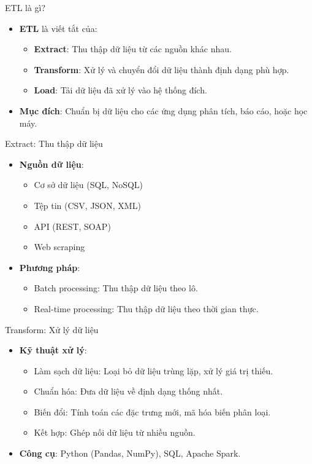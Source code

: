 \documentclass{beamer}
\begin{document}
\begin{frame}{ETL là gì?}
    \begin{itemize}
        \item \textbf{ETL} là viết tắt của:
        \begin{itemize}
            \item \textbf{Extract}: Thu thập dữ liệu từ các nguồn khác nhau.
            \item \textbf{Transform}: Xử lý và chuyển đổi dữ liệu thành định dạng phù hợp.
            \item \textbf{Load}: Tải dữ liệu đã xử lý vào hệ thống đích.
        \end{itemize}
        \item \textbf{Mục đích}: Chuẩn bị dữ liệu cho các ứng dụng phân tích, báo cáo, hoặc học máy.
    \end{itemize}
\end{frame}

\begin{frame}{Extract: Thu thập dữ liệu}
    \begin{itemize}
        \item \textbf{Nguồn dữ liệu}:
        \begin{itemize}
            \item Cơ sở dữ liệu (SQL, NoSQL)
            \item Tệp tin (CSV, JSON, XML)
            \item API (REST, SOAP)
            \item Web scraping
        \end{itemize}
        \item \textbf{Phương pháp}:
        \begin{itemize}
            \item Batch processing: Thu thập dữ liệu theo lô.
            \item Real-time processing: Thu thập dữ liệu theo thời gian thực.
        \end{itemize}
    \end{itemize}
\end{frame}

\begin{frame}{Transform: Xử lý dữ liệu}
    \begin{itemize}
        \item \textbf{Kỹ thuật xử lý}:
        \begin{itemize}
            \item Làm sạch dữ liệu: Loại bỏ dữ liệu trùng lặp, xử lý giá trị thiếu.
            \item Chuẩn hóa: Đưa dữ liệu về định dạng thống nhất.
            \item Biến đổi: Tính toán các đặc trưng mới, mã hóa biến phân loại.
            \item Kết hợp: Ghép nối dữ liệu từ nhiều nguồn.
        \end{itemize}
        \item \textbf{Công cụ}: Python (Pandas, NumPy), SQL, Apache Spark.
    \end{itemize}
\end{frame}
\end{document}
